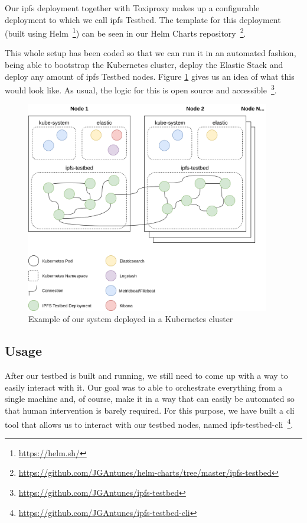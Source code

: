 Our \acrshort{ipfs} deployment together with Toxiproxy makes up a configurable deployment
to which we call \acrshort{ipfs} Testbed. The template for this deployment (built using
Helm~\footnote{\url{https://helm.sh/}}) can be seen in our Helm Charts
repository~\footnote{\url{https://github.com/JGAntunes/helm-charts/tree/master/ipfs-testbed}}.

This whole setup has been coded so that we can run it in an automated fashion,
being able to bootstrap the Kubernetes cluster, deploy the Elastic Stack and
deploy any amount of \acrshort{ipfs} Testbed nodes. Figure
\ref{fig:ipfs-testbed-kubernetes-overview} gives us an idea of what this would
look like. As usual, the logic for this is open source and
accessible~\footnote{\url{https://github.com/JGAntunes/ipfs-testbed}}.

\begin{figure}[!htb]
  \centering
  \includegraphics[width=0.95\textwidth]{img/ipfs-testbed-kubernetes-overview.png}
  \caption{Example of our system deployed in a Kubernetes cluster}
  \label{fig:ipfs-testbed-kubernetes-overview}
\end{figure}

\subsection{Usage}\label{subsec:testbed-usage}

After our testbed is built and running, we still need to come up with a way to
easily interact with it. Our goal was to able to orchestrate everything from a
single machine and, of course, make it in a way that can easily be automated so
that human intervention is barely required. For this purpose, we have built a
\acrshort{cli} tool that allows us to interact with our testbed nodes, named
ipfs-testbed-cli~\footnote{\url{https://github.com/JGAntunes/ipfs-testbed-cli}}. 


